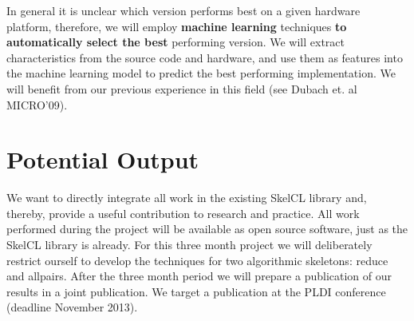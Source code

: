 \documentclass[11pt,a4paper]{article}
\begin{document}
In general it is unclear which version performs best on a given hardware platform, therefore, we will employ \textbf{machine learning} techniques \textbf{to automatically select the best} performing version. We will extract characteristics from the source code and hardware, and use them as features into the machine learning model to predict the best performing implementation. We will benefit from our previous experience in this field (see Dubach et. al MICRO'09).

\section{Potential Output}
We want to directly integrate all work in the existing SkelCL library and, thereby, provide a useful contribution to research and practice. All work performed during the project will be available as open source software, just as the SkelCL library is already. For this three month project we will deliberately restrict ourself to develop the techniques for two algorithmic skeletons: reduce and allpairs. After the three month period we will prepare a publication of our results in a joint publication. We target a publication at the PLDI conference (deadline November 2013).
\end{document}
